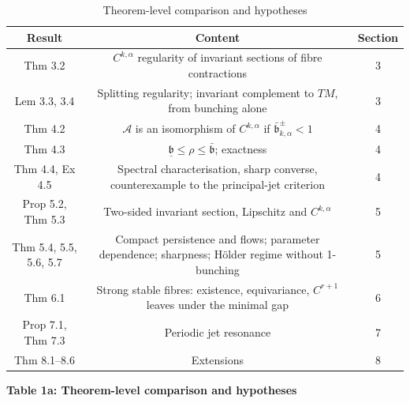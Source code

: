 \documentclass[11pt,a4paper]{article}
\theoremstyle{plain}
\theoremstyle{definition}
\theoremstyle{remark}
\numberwithin{equation}{section}
\numberwithin{figure}{section}
\begin{document}
\begin{table}[h]
\centering
\begin{tabular}{c|c|c}
\toprule
Result & Content & Section\\
\midrule
Thm 3.2 & $C^{k,\alpha}$ regularity of invariant sections of fibre contractions & 3 \\
Lem 3.3, 3.4 & Splitting regularity; invariant complement to $TM$, from bunching alone & 3 \\
Thm 4.2 & $\mathcal A$ is an isomorphism of $C^{k,\alpha}$ if $\bar{\mathfrak b}^\pm_{k,\alpha}<1$ & 4 \\
Thm 4.3 & $\underline{\mathfrak b}\le\rho\le\bar{\mathfrak b}$; exactness & 4 \\
Thm 4.4, Ex 4.5 & Spectral characterisation, sharp converse, counterexample to the principal-jet criterion & 4 \\
Prop 5.2, Thm 5.3 & Two-sided invariant section, Lipschitz and $C^{k,\alpha}$ & 5 \\
Thm 5.4, 5.5, 5.6, 5.7 & Compact persistence and flows; parameter dependence; sharpness; Hölder regime without 1-bunching & 5 \\
Thm 6.1 & Strong stable fibres: existence, equivariance, $C^{r+1}$ leaves under the minimal gap & 6 \\
Prop 7.1, Thm 7.3 & Periodic jet resonance & 7 \\
Thm 8.1–8.6 & Extensions & 8 \\
\bottomrule
\end{tabular}
\caption{Theorem-level comparison and hypotheses}
\label{tab:results}
\end{table}

\textbf{Table 1a: Theorem-level comparison and hypotheses}
\end{document}
